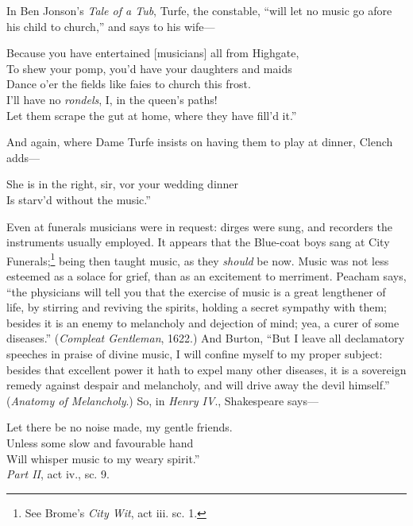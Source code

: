 In Ben Jonson’s \textit{Tale of a Tub}, Turfe, the constable, “will let no music go afore
his child to church,” and says to his wife—
\settowidth{\versewidth}{Because you have entertained [musicians] all from Highgate,}
\begin{scverse}
Because you have entertained [musicians] all from Highgate,\\
To shew your pomp, you’d have your daughters and maids\\
Dance o’er the fields like faies to church this frost.\\
I’ll have no \textit{rondels}, I, in the queen’s paths!\\
Let them scrape the gut at home, where they have fill’d it.”
\end{scverse}
And again, where Dame Turfe insists on having them to play at dinner, Clench
adds—
\begin{scverse}
She is in the right, sir, vor your wedding dinner\\
Is starv’d without the music.”
\end{scverse}

Even at funerals musicians were in request: dirges were sung, and recorders the
instruments usually employed. It appears that the Blue-coat boys sang at City
Funerals;\footnote{\textit{}
See Brome’s \textit{City Wit}, act iii. sc. 1.}
being then taught music, as they \textit{should} be now. Music was not less
esteemed as a solace for grief, than as an excitement to merriment. Peacham says,
“the physicians will tell you that the exercise of music is a great lengthener of life,
by stirring and reviving the spirits, holding a secret sympathy with them; besides
it is an enemy to melancholy and dejection of mind; yea, a curer of some diseases.” 
(\textit{Compleat Gentleman}, 1622.) And Burton, “But I leave all declamatory
speeches in praise of divine music, I will confine myself to my proper subject:
besides that excellent power it hath to expel many other diseases, it is a sovereign
remedy against despair and melancholy, and will drive away the devil himself.” 
(\textit{Anatomy of Melancholy}.) So, in \textit{Henry IV}., Shakespeare says—
\pagebreak

\settowidth{\versewidth}{Let there be no noise made, my gentle friends.}
\begin{scverse}
Let there be no noise made, my gentle friends.\\
Unless some slow and favourable hand\\
Will whisper music to my weary spirit.”\\
\attribution \textit{Part II}, act iv., sc. 9.
\end{scverse}

